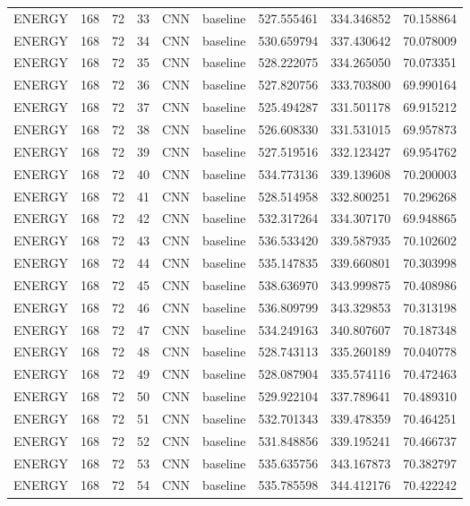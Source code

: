 \begin{table}
\begin{tabular}{lrrrllrrr}
ENERGY & 168 & 72 & 33 & CNN & baseline & 527.555461 & 334.346852 & 70.158864 \\
ENERGY & 168 & 72 & 34 & CNN & baseline & 530.659794 & 337.430642 & 70.078009 \\
ENERGY & 168 & 72 & 35 & CNN & baseline & 528.222075 & 334.265050 & 70.073351 \\
ENERGY & 168 & 72 & 36 & CNN & baseline & 527.820756 & 333.703800 & 69.990164 \\
ENERGY & 168 & 72 & 37 & CNN & baseline & 525.494287 & 331.501178 & 69.915212 \\
ENERGY & 168 & 72 & 38 & CNN & baseline & 526.608330 & 331.531015 & 69.957873 \\
ENERGY & 168 & 72 & 39 & CNN & baseline & 527.519516 & 332.123427 & 69.954762 \\
ENERGY & 168 & 72 & 40 & CNN & baseline & 534.773136 & 339.139608 & 70.200003 \\
ENERGY & 168 & 72 & 41 & CNN & baseline & 528.514958 & 332.800251 & 70.296268 \\
ENERGY & 168 & 72 & 42 & CNN & baseline & 532.317264 & 334.307170 & 69.948865 \\
ENERGY & 168 & 72 & 43 & CNN & baseline & 536.533420 & 339.587935 & 70.102602 \\
ENERGY & 168 & 72 & 44 & CNN & baseline & 535.147835 & 339.660801 & 70.303998 \\
ENERGY & 168 & 72 & 45 & CNN & baseline & 538.636970 & 343.999875 & 70.408986 \\
ENERGY & 168 & 72 & 46 & CNN & baseline & 536.809799 & 343.329853 & 70.313198 \\
ENERGY & 168 & 72 & 47 & CNN & baseline & 534.249163 & 340.807607 & 70.187348 \\
ENERGY & 168 & 72 & 48 & CNN & baseline & 528.743113 & 335.260189 & 70.040778 \\
ENERGY & 168 & 72 & 49 & CNN & baseline & 528.087904 & 335.574116 & 70.472463 \\
ENERGY & 168 & 72 & 50 & CNN & baseline & 529.922104 & 337.789641 & 70.489310 \\
ENERGY & 168 & 72 & 51 & CNN & baseline & 532.701343 & 339.478359 & 70.464251 \\
ENERGY & 168 & 72 & 52 & CNN & baseline & 531.848856 & 339.195241 & 70.466737 \\
ENERGY & 168 & 72 & 53 & CNN & baseline & 535.635756 & 343.167873 & 70.382797 \\
ENERGY & 168 & 72 & 54 & CNN & baseline & 535.785598 & 344.412176 & 70.422242 \\

\end{tabular}
\end{table}
